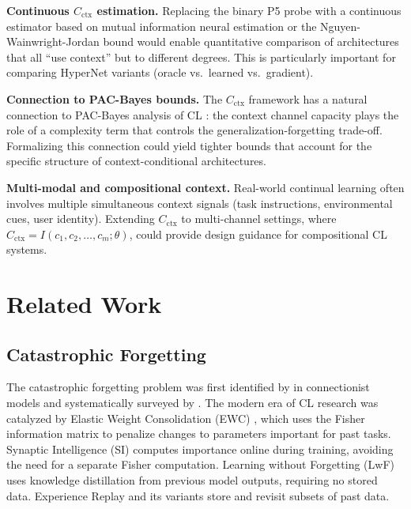 \documentclass{article}
\begin{document}
\textbf{Continuous $C_\mathrm{ctx}$ estimation.} Replacing the binary P5 probe with a continuous estimator based on mutual information neural estimation \citep{belghazi2018mine} or the Nguyen-Wainwright-Jordan bound would enable quantitative comparison of architectures that all ``use context'' but to different degrees. This is particularly important for comparing HyperNet variants (oracle vs.\ learned vs.\ gradient).

\textbf{Connection to PAC-Bayes bounds.} The $C_\mathrm{ctx}$ framework has a natural connection to PAC-Bayes analysis of CL \citep{doan2021theoretical}: the context channel capacity plays the role of a complexity term that controls the generalization-forgetting trade-off. Formalizing this connection could yield tighter bounds that account for the specific structure of context-conditional architectures.

\textbf{Multi-modal and compositional context.} Real-world continual learning often involves multiple simultaneous context signals (task instructions, environmental cues, user identity). Extending $C_\mathrm{ctx}$ to multi-channel settings, where $C_\mathrm{ctx} = I(c_1, c_2, \ldots, c_m; \theta)$, could provide design guidance for compositional CL systems.


\section{Related Work}
\label{sec:related}

\subsection{Catastrophic Forgetting}

The catastrophic forgetting problem was first identified by \citet{mccloskey1989catastrophic} in connectionist models and systematically surveyed by \citet{french1999catastrophic}. The modern era of CL research was catalyzed by Elastic Weight Consolidation (EWC) \citep{kirkpatrick2017overcoming}, which uses the Fisher information matrix to penalize changes to parameters important for past tasks. Synaptic Intelligence (SI) \citep{zenke2017continual} computes importance online during training, avoiding the need for a separate Fisher computation. Learning without Forgetting (LwF) \citep{li2017learning} uses knowledge distillation from previous model outputs, requiring no stored data. Experience Replay and its variants \citep{chaudhry2019tiny} store and revisit subsets of past data.
\end{document}
